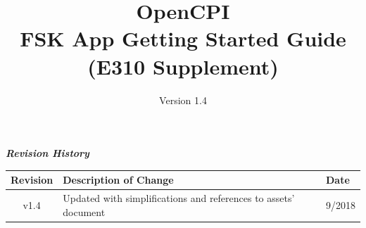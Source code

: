 \def\docTitle{OpenCPI\\ FSK App Getting Started Guide\\ (E310 Supplement)}
\def\docVersion{1.4}

\date{Version \docVersion} %
\title{\docTitle}
\usepackage[T1]{fontenc} %
\usepackage{graphicx}
\graphicspath{ {figures/} }
\usepackage{textcomp}

\maketitle
\newpage

	\begin{center}
	\textit{\textbf{Revision History}}
		\begin{table}[H]
		\label{table:revisions} %
			\begin{tabularx}{\textwidth}{|c|X|l|}
			\hline
			\rowcolor{blue}
			\textbf{Revision} & \textbf{Description of Change} & \textbf{Date} \\
		    \hline
			v1.4 & Updated with simplifications and references to assets' document & 9/2018 \\
			\hline
			\end{tabularx}
		\end{table}
	\end{center}

